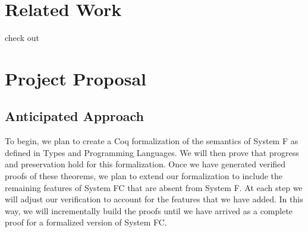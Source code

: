 \documentclass{sig-alternate}
\begin{document}
\section{Related Work}
\label{sec:related_work}

check out~\cite{latex_wikibook}
\section{Project Proposal}
\label{sec:project_proposal}

\subsection{Anticipated Approach}
\label{subsec:approach}
To begin, we plan to create a Coq formalization of the semantics of System F as defined in Types and Programming Languages. We will then prove that progress and preservation hold for this formalization. Once we have generated verified proofs of these theorems, we plan to extend our formalization to include the remaining features of System FC that are absent from System F.  At each step we will adjust our verification to account for the features that we have added.  In this way, we will incrementally build the proofs until we have arrived as a complete proof for a formalized version of System FC.
\end{document}
